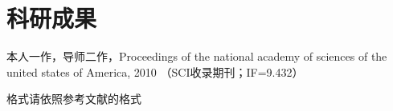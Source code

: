 
\chapter*{科研成果}
{}

\setlength{\parskip}{6pt}
\begin{enumerate}[label={[\arabic*]}]
  \item 本人一作，导师二作，Proceedings of the national academy of sciences of the united states of America, 2010 （SCI收录期刊；IF=9.432）
\end{enumerate}

格式请依照参考文献的格式